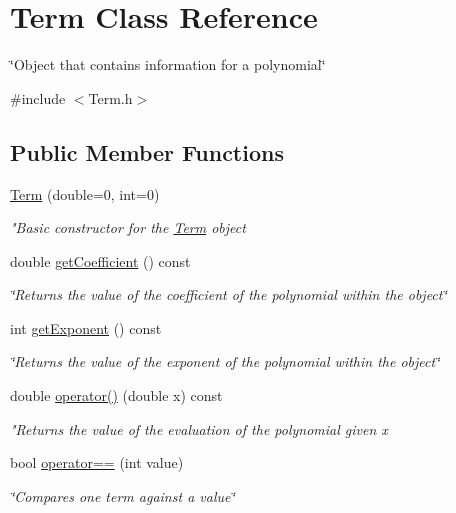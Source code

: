 \hypertarget{classTerm}{\section{Term Class Reference}
\label{classTerm}
}


\char`\"{}\-Object that contains information for a polynomial\char`\"{}  




{\ttfamily \#include $<$Term.\-h$>$}

\subsection*{Public Member Functions}
\begin{DoxyCompactItemize}
\item 
\hyperlink{classTerm_aa72ef129269040b50836346dcae32154}{Term} (double=0, int=0)
\begin{DoxyCompactList}\small\item\em "Basic constructor for the \hyperlink{classTerm}{Term} object \end{DoxyCompactList}\item 
double \hyperlink{classTerm_a51ba0eb6ed3140d3fb2fe43cc4bdcace}{get\-Coefficient} () const 
\begin{DoxyCompactList}\small\item\em \char`\"{}\-Returns the value of the coefficient of the polynomial within the object\char`\"{} \end{DoxyCompactList}\item 
int \hyperlink{classTerm_a97ab7c2fa2a3b39939c2d9b0498276ae}{get\-Exponent} () const 
\begin{DoxyCompactList}\small\item\em \char`\"{}\-Returns the value of the exponent of the polynomial within the object\char`\"{} \end{DoxyCompactList}\item 
double \hyperlink{classTerm_ab89ea23f82711d4fc9f4608d0937ce31}{operator()} (double x) const 
\begin{DoxyCompactList}\small\item\em "Returns the value of the evaluation of the polynomial given x \end{DoxyCompactList}\item 
bool \hyperlink{classTerm_a8e563a63ca972c9d2cffacb471a611a5}{operator==} (int value)
\begin{DoxyCompactList}\small\item\em \char`\"{}\-Compares one term against a value\char`\"{} \end{DoxyCompactList}\item 

\end{DoxyCompactItemize}
